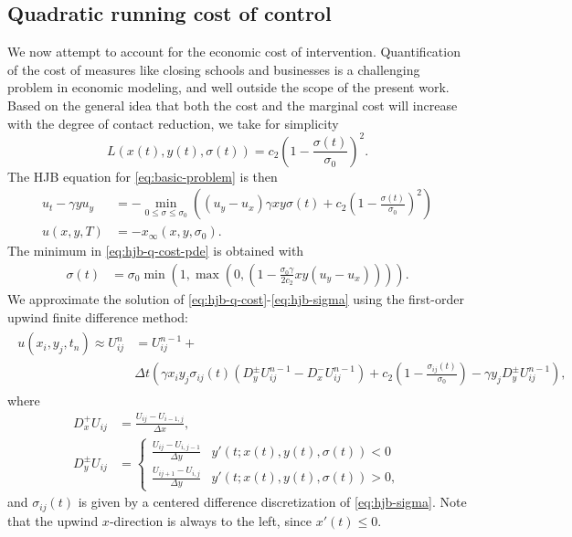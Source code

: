 \documentclass[english,12pt,letter]{article}
\newcommand{\Rnot}{\sigma_0}
\newcommand{\Sinf}{x_\infty}
\newcommand{\Dt}{\Delta t}
\newcommand{\Dx}{\Delta x}
\newcommand{\Dy}{\Delta y}
\begin{document}
\subsection{Quadratic running cost of control}
We now attempt to account for the economic cost of intervention.  Quantification
of the cost of measures like closing schools and businesses is a challenging
problem in economic modeling, and well outside the scope of the present work.
Based on the general idea that both the cost and the marginal cost will increase
with the degree of contact reduction, we take for simplicity
$$
    L(x(t),y(t),\sigma(t)) = c_2 \left(1-\frac{\sigma(t)}{\Rnot}\right)^2.
$$
The HJB equation for \eqref{eq:basic-problem} is then
\begin{subequations} \label{eq:hjb-q-cost}
\begin{align} \label{eq:hjb-q-cost-pde}
    u_t - \gamma y u_y & = - \min_{0\le \sigma\le \Rnot} \left((u_y-u_x)\gamma x y \sigma(t) + c_2 \left(1-\frac{\sigma(t)}{\Rnot}\right)^2 \right) \\
    u(x,y,T) & = -\Sinf(x,y,\Rnot).
\end{align}
\end{subequations}
The minimum in \eqref{eq:hjb-q-cost-pde} is obtained with
\begin{align} \label{eq:hjb-sigma}
    \sigma(t) & = \Rnot\min\left(1,\max\left(0,\left(1-\frac{\Rnot\gamma}{2c_2}x y (u_y-u_x)\right)\right)\right).
\end{align}
We approximate the solution of \eqref{eq:hjb-q-cost}-\eqref{eq:hjb-sigma} using the first-order
upwind finite difference method:
\begin{align}
\begin{split}
    u(x_i,y_j,t_n) \approx U^{n}_{ij} & = U^{n-1}_{ij} + \\
    & \Dt \left(\gamma x_i y_j \sigma_{ij}(t) (D^\pm_y U^{n-1}_{ij} - D^-_x U^{n-1}_{ij}) 
        + c_2\left(1-\frac{\sigma_{ij}(t)}{\Rnot}\right) - \gamma y_j D^\pm_y U^{n-1}_{ij}\right),
\end{split}
\end{align}
where
\begin{align*}
    D^+_x U_{ij} & = \frac{U_{ij}-U_{i-1,j}}{\Dx}, \\
    D^\pm_y U_{ij} & =
    \begin{cases}
        \frac{U_{ij}-U_{i,j-1}}{\Dy} & y'(t;x(t),y(t),\sigma(t))<0 \\
        \frac{U_{ij+1}-U_{i,j}}{\Dy} & y'(t;x(t),y(t),\sigma(t))>0,
    \end{cases}
\end{align*}
and $\sigma_{ij}(t)$ is given by a centered difference discretization of \eqref{eq:hjb-sigma}.
Note that the upwind $x$-direction is always to the left, since $x'(t)\le0$.
\end{document}
